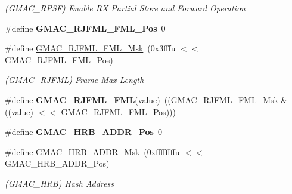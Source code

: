 \begin{DoxyCompactItemize}
\begin{DoxyCompactList}\small\item\em (G\+M\+A\+C\+\_\+\+R\+P\+SF) Enable RX Partial Store and Forward Operation \end{DoxyCompactList}\item 
\mbox{\label{group__SAMV71__GMAC_ga7ba9989d3f68bae689da8b680fe8ed6f}} 
\#define {\bfseries G\+M\+A\+C\+\_\+\+R\+J\+F\+M\+L\+\_\+\+F\+M\+L\+\_\+\+Pos}~0
\item 
\mbox{\label{group__SAMV71__GMAC_ga049bdd4d6c1ce5dd9b27539c1ba39c23}} 
\#define \mbox{\hyperlink{group__SAMV71__GMAC_ga049bdd4d6c1ce5dd9b27539c1ba39c23}{G\+M\+A\+C\+\_\+\+R\+J\+F\+M\+L\+\_\+\+F\+M\+L\+\_\+\+Msk}}~(0x3fffu $<$$<$ G\+M\+A\+C\+\_\+\+R\+J\+F\+M\+L\+\_\+\+F\+M\+L\+\_\+\+Pos)
\begin{DoxyCompactList}\small\item\em (G\+M\+A\+C\+\_\+\+R\+J\+F\+ML) Frame Max Length \end{DoxyCompactList}\item 
\mbox{\label{group__SAMV71__GMAC_ga473e9dbee634d96458ff55119a3753eb}} 
\#define {\bfseries G\+M\+A\+C\+\_\+\+R\+J\+F\+M\+L\+\_\+\+F\+ML}(value)~((\mbox{\hyperlink{group__SAMV71__GMAC_ga049bdd4d6c1ce5dd9b27539c1ba39c23}{G\+M\+A\+C\+\_\+\+R\+J\+F\+M\+L\+\_\+\+F\+M\+L\+\_\+\+Msk}} \& ((value) $<$$<$ G\+M\+A\+C\+\_\+\+R\+J\+F\+M\+L\+\_\+\+F\+M\+L\+\_\+\+Pos)))
\item 
\mbox{\label{group__SAMV71__GMAC_ga9363b4e2c07082833a0a041f4159596d}} 
\#define {\bfseries G\+M\+A\+C\+\_\+\+H\+R\+B\+\_\+\+A\+D\+D\+R\+\_\+\+Pos}~0
\item 
\mbox{\label{group__SAMV71__GMAC_gab52c79a040ec7a18cb28a18163cf33d9}} 
\#define \mbox{\hyperlink{group__SAMV71__GMAC_gab52c79a040ec7a18cb28a18163cf33d9}{G\+M\+A\+C\+\_\+\+H\+R\+B\+\_\+\+A\+D\+D\+R\+\_\+\+Msk}}~(0xffffffffu $<$$<$ G\+M\+A\+C\+\_\+\+H\+R\+B\+\_\+\+A\+D\+D\+R\+\_\+\+Pos)
\begin{DoxyCompactList}\small\item\em (G\+M\+A\+C\+\_\+\+H\+RB) Hash Address \end{DoxyCompactList}\item 
\mbox{\label{group__SAMV71__GMAC_ga61abf140f19d064bd8ffd48aaa12d744}} 
$$
\end{DoxyCompactItemize}

